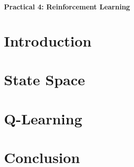 \documentclass[10pt, oneside]{article}
\begin{document}
\centerline{\Large{\textbf{Practical 4: Reinforcement Learning}}}
\vspace{6px}
\section{Introduction}
\section{State Space}
\section{Q-Learning}
\section{Conclusion}
\end{document}
